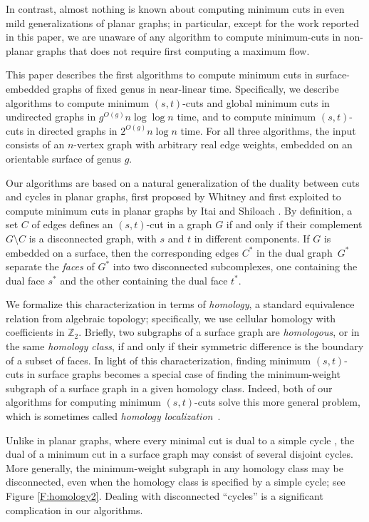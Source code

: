 \documentclass[11pt,twoside]{article}
\def\Z{\mathbb{Z}}
\begin{document}
In contrast, almost nothing is known about computing minimum cuts in even mild generalizations of planar graphs; in particular, except for the work reported in this paper, we are unaware of any algorithm to compute minimum-cuts in non-planar graphs that does not require first computing a maximum flow.  

This paper describes the first algorithms to compute minimum cuts in surface-embedded graphs of fixed genus in near-linear time.  Specifically, we describe algorithms to compute minimum $(s,t)$-cuts and global minimum cuts in undirected graphs in $g^{O(g)} n\log\log n$ time, and to compute minimum $(s,t)$-cuts in directed graphs in $2^{O(g)} n\log n$ time.  For all three algorithms, the input consists of an $n$-vertex graph with arbitrary real edge weights, embedded on an orientable surface of genus $g$.

Our algorithms are based on a natural generalization of the duality between cuts and cycles in planar graphs, first proposed by Whitney \cite{w-pg-33} and first exploited to compute minimum cuts in planar graphs by Itai and Shiloach \cite{is-mfpn-79}.  By definition, a set $C$ of edges defines an $(s,t)$-cut in a graph $G$ if and only if their complement $G\setminus C$ is a disconnected graph, with $s$ and $t$ in different components.  If $G$ is embedded on a surface, then the corresponding edges $C^*$ in the dual graph~$G^*$ separate the \emph{faces} of $G^*$ into two disconnected subcomplexes, one containing the dual face $s^*$ and the other containing the dual face $t^*$. 

We formalize this characterization in terms of \emph{homology}, a standard equivalence relation from algebraic topology; specifically, we use cellular homology with coefficients in $\Z_2$.  Briefly, two subgraphs of a surface graph are \emph{homologous}, or in the same \emph{homology class}, if and only if their symmetric difference is the boundary of a subset of faces.  In light of this characterization, finding minimum $(s,t)$-cuts in surface graphs becomes a special case of finding the minimum-weight subgraph of a surface graph in a given homology class.  Indeed, both of our algorithms for computing minimum $(s,t)$-cuts solve this more general problem, which is sometimes called \emph{homology localization}~\cite{cf-qhc-08,cf-hrhl-10}.

Unlike in planar graphs, where every minimal cut is  dual to a simple cycle \cite{w-pg-33}, the dual of a minimum cut in a surface graph may consist of several disjoint cycles.  More generally, the minimum-weight subgraph in any homology class may be disconnected, even when the homology class is specified by a simple cycle; see Figure \ref{F:homology2}.  Dealing with disconnected “cycles” is a significant complication in our algorithms.
\end{document}
